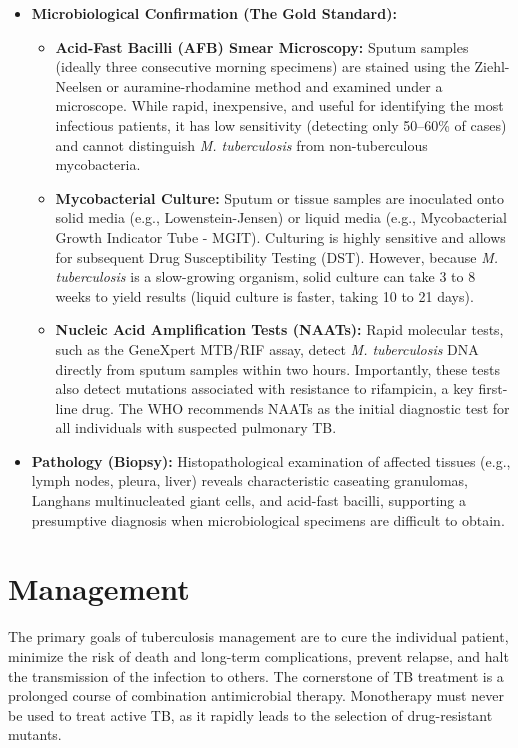 \begin{itemize}
\begin{itemize}
    \end{itemize}
    \item \textbf{Microbiological Confirmation (The Gold Standard):}
    \begin{itemize}
        \item \textbf{Acid-Fast Bacilli (AFB) Smear Microscopy:} Sputum samples (ideally three consecutive morning specimens) are stained using the Ziehl-Neelsen or auramine-rhodamine method and examined under a microscope. While rapid, inexpensive, and useful for identifying the most infectious patients, it has low sensitivity (detecting only 50--60\% of cases) and cannot distinguish \textit{M. tuberculosis} from non-tuberculous mycobacteria.
        \item \textbf{Mycobacterial Culture:} Sputum or tissue samples are inoculated onto solid media (e.g., Lowenstein-Jensen) or liquid media (e.g., Mycobacterial Growth Indicator Tube - MGIT). Culturing is highly sensitive and allows for subsequent Drug Susceptibility Testing (DST). However, because \textit{M. tuberculosis} is a slow-growing organism, solid culture can take 3 to 8 weeks to yield results (liquid culture is faster, taking 10 to 21 days).
        \item \textbf{Nucleic Acid Amplification Tests (NAATs):} Rapid molecular tests, such as the GeneXpert MTB/RIF assay, detect \textit{M. tuberculosis} DNA directly from sputum samples within two hours. Importantly, these tests also detect mutations associated with resistance to rifampicin, a key first-line drug. The WHO recommends NAATs as the initial diagnostic test for all individuals with suspected pulmonary TB.
    \end{itemize}
    \item \textbf{Pathology (Biopsy):} Histopathological examination of affected tissues (e.g., lymph nodes, pleura, liver) reveals characteristic caseating granulomas, Langhans multinucleated giant cells, and acid-fast bacilli, supporting a presumptive diagnosis when microbiological specimens are difficult to obtain.
\end{itemize}

\section*{Management}
The primary goals of tuberculosis management are to cure the individual patient, minimize the risk of death and long-term complications, prevent relapse, and halt the transmission of the infection to others. The cornerstone of TB treatment is a prolonged course of combination antimicrobial therapy. Monotherapy must never be used to treat active TB, as it rapidly leads to the selection of drug-resistant mutants.


